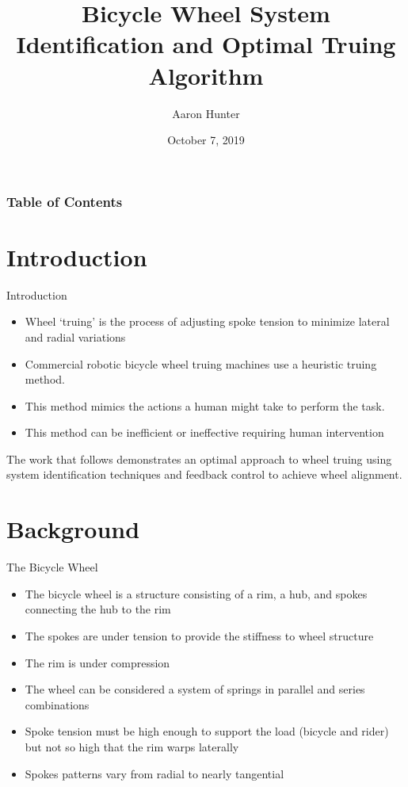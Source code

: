 \documentclass[mathserif]{beamer}
\title{Bicycle Wheel System Identification and Optimal Truing Algorithm}
\author{Aaron Hunter}
\date{October 7, 2019}
\begin{document}
\maketitle

\begin{frame}
    \frametitle{Table of Contents}
    \tableofcontents
\end{frame}

\section{Introduction}
  \begin{frame}{Introduction}
    \begin{itemize}
        \item Wheel `truing' is the process of adjusting spoke tension to minimize lateral and radial variations
        \item Commercial robotic bicycle wheel truing machines use a heuristic truing method.  
        \item This method mimics the actions a human might take to perform the task.
        \item This method can be inefficient or ineffective requiring human intervention
    \end{itemize}
     The work that follows demonstrates an optimal approach to wheel truing using system identification techniques and feedback control to achieve wheel alignment. 
  \end{frame}
    
\section{Background}

\begin{frame}{The Bicycle Wheel}
    \begin{itemize}
    \item The bicycle wheel is a structure consisting of a rim, a hub, and spokes connecting the hub to the rim
    \item The spokes are under tension to provide the stiffness to wheel structure
    \item The rim is under compression
    \item The wheel can be considered a system of springs in parallel and series combinations
    \item Spoke tension must be high enough to support the load (bicycle and rider) but not so high that the rim warps laterally
    \item Spokes patterns vary from radial to nearly tangential
    \end{itemize}
\end{frame}
\end{document}
